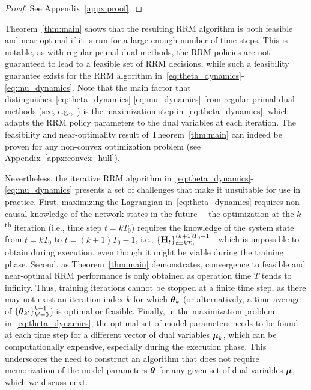 \documentclass[lettersize,journal]{IEEEtran}
\newcommand{\nn}[1]{{\textcolor{red}{[\textit{Navid: #1}]}}}
\begin{document}
\begin{proof}
See Appendix~\ref{appx:proof}.
\end{proof}



Theorem~\ref{thm:main} shows that the resulting RRM algorithm is both feasible and near-optimal if it is run for a large-enough number of time steps. This is notable, as with regular primal-dual methods, the RRM policies are not guaranteed to lead to a feasible set of RRM decisions, while such a feasibility guarantee exists for the RRM algorithm in~\eqref{eq:theta_dynamics}-\eqref{eq:mu_dynamics}. Note that the main factor that distinguishes~\eqref{eq:theta_dynamics}-\eqref{eq:mu_dynamics} from regular primal-dual methods (see, e.g.,~\cite{eisen2019learning}) is the maximization step in~\eqref{eq:theta_dynamics}, which adapts the RRM policy parameters to the dual variables at each iteration. %
The feasibility and near-optimality result of Theorem~\ref{thm:main} can indeed be proven for any non-convex optimization problem (see Appendix~\ref{appx:convex_hull}).

Nevertheless, the iterative RRM algorithm in~\eqref{eq:theta_dynamics}-\eqref{eq:mu_dynamics} presents a set of challenges that make it unsuitable for use in practice. First, maximizing the Lagrangian in~\eqref{eq:theta_dynamics} requires non-causal knowledge of the network states in the future%
---the optimization at the $k$\textsuperscript{th} iteration (i.e., time step $t=kT_0$) requires the knowledge of the system state from $t=kT_0$ to $t=(k+1)T_0-1$, i.e., $\{{\mathbf H}_t\}_{t=kT_0}^{(k+1)T_0-1}$---which is impossible to obtain during execution, even though it might be viable during the training phase. Second, as Theorem~\ref{thm:main} demonstrates, convergence to  feasible and near-optimal RRM performance is only obtained as operation time $T$ tends to infinity. Thus, training iterations cannot be stopped at a finite time step, as there may not exist an iteration index $k$ for which $\boldsymbol{\theta}_k$ (or alternatively, a time average of $\{\boldsymbol{\theta}_{k'}\}_{k'=0}^{k-1}$) is optimal or feasible. %
Finally, in the maximization problem in~\eqref{eq:theta_dynamics}, the optimal set of model parameters needs to be found at each time step for a different vector of dual variables $\boldsymbol{\mu}_k$, which can be computationally expensive, especially during the execution phase. This underscores the need to construct an algorithm that does not require memorization of the model parameters $\boldsymbol{\theta}$ for any given set of dual variables $\boldsymbol{\mu}$, which we discuss next.
\end{document}
